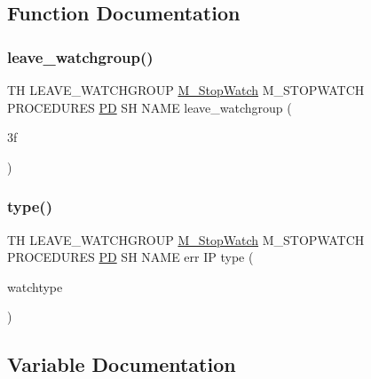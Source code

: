 \subsection{Function Documentation}
\mbox{\label{leave__watchgroup_83_8txt_a430ff35f15204a9a4a68a5ae64e8ff98}} 
\subsubsection{\texorpdfstring{leave\+\_\+watchgroup()}{leave\_watchgroup()}}
{\footnotesize\ttfamily TH L\+E\+A\+V\+E\+\_\+\+W\+A\+T\+C\+H\+G\+R\+O\+UP \hyperlink{option__stopwatch_83_8txt_aa2011fc45a5e502e87ee50996a8a9305}{M\+\_\+\+Stop\+Watch} M\+\_\+\+S\+T\+O\+P\+W\+A\+T\+CH P\+R\+O\+C\+E\+D\+U\+R\+ES \hyperlink{what__overview_81_8txt_a85f26da5a4481fbdb0d9c79f2b94de3e}{PD} SH N\+A\+ME leave\+\_\+watchgroup (\begin{DoxyParamCaption}\item[{3f}]{ }\end{DoxyParamCaption})}

\mbox{\label{leave__watchgroup_83_8txt_afa66a982f4f99718b3217e7853d3d439}} 
\subsubsection{\texorpdfstring{type()}{type()}}
{\footnotesize\ttfamily TH L\+E\+A\+V\+E\+\_\+\+W\+A\+T\+C\+H\+G\+R\+O\+UP \hyperlink{option__stopwatch_83_8txt_aa2011fc45a5e502e87ee50996a8a9305}{M\+\_\+\+Stop\+Watch} M\+\_\+\+S\+T\+O\+P\+W\+A\+T\+CH P\+R\+O\+C\+E\+D\+U\+R\+ES \hyperlink{what__overview_81_8txt_a85f26da5a4481fbdb0d9c79f2b94de3e}{PD} SH N\+A\+ME err IP type (\begin{DoxyParamCaption}\item[{watchtype}]{ }\end{DoxyParamCaption})}



\subsection{Variable Documentation}
\mbox{\label{leave__watchgroup_83_8txt_ad6c5ebd26f707ef8da754021612a7c8d}} 
